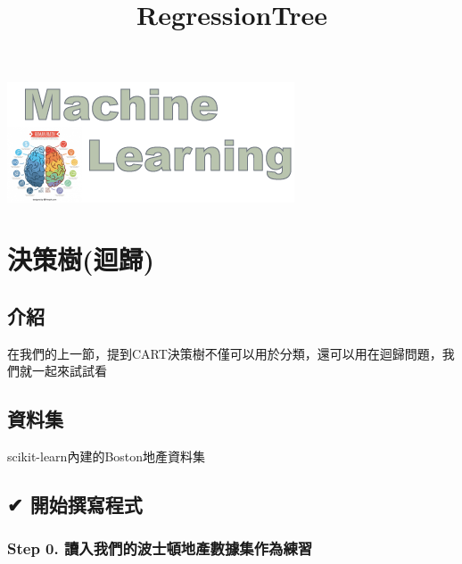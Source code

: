\documentclass[11pt]{ctexart}
\title{RegressionTree}
\makeatletter
\def\maxwidth{\ifdim\Gin@nat@width>\linewidth\linewidth
    \else\Gin@nat@width\fi}
\let\Oldincludegraphics\includegraphics
\renewcommand{\includegraphics}[1]{\Oldincludegraphics[width=.8\maxwidth]{#1}}
\makeatother
\begin{document}
    
    
    \maketitle
    
    

    
    \includegraphics{cover.png}

\hypertarget{ux6c7aux7b56ux6a39ux8ff4ux6b78}{%
\section{決策樹(迴歸)}\label{ux6c7aux7b56ux6a39ux8ff4ux6b78}}

\hypertarget{ux4ecbux7d39}{%
\subsection{介紹}\label{ux4ecbux7d39}}

在我們的上一節，提到CART決策樹不僅可以用於分類，還可以用在迴歸問題，我們就一起來試試看

\hypertarget{ux8cc7ux6599ux96c6}{%
\subsection{資料集}\label{ux8cc7ux6599ux96c6}}

scikit-learn內建的Boston地產資料集

    \hypertarget{ux958bux59cbux64b0ux5bebux7a0bux5f0f}{%
\subsection{✔ 開始撰寫程式}\label{ux958bux59cbux64b0ux5bebux7a0bux5f0f}}

\hypertarget{step-0.-ux8b80ux5165ux6211ux5011ux7684ux6ce2ux58ebux9813ux5730ux7522ux6578ux64daux96c6ux4f5cux70baux7df4ux7fd2}{%
\subsubsection{Step 0.
讀入我們的波士頓地產數據集作為練習}\label{step-0.-ux8b80ux5165ux6211ux5011ux7684ux6ce2ux58ebux9813ux5730ux7522ux6578ux64daux96c6ux4f5cux70baux7df4ux7fd2}}
\end{document}
